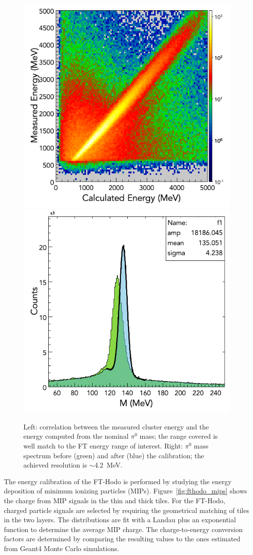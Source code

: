\begin{figure}
\includegraphics[height=0.48\columnwidth]{fig/ftcal_pi0linearity.png}
\includegraphics[height=0.48\columnwidth]{fig/ftcal_pi0resolution.png}
\caption{Left: correlation between the measured cluster energy and the energy computed from the nominal $\pi^0$
  mass; the range covered is well match to the FT energy range of interest. Right: $\pi^0$ mass spectrum before
  (green) and after (blue) the calibration; the achieved resolution is $\sim$4.2~MeV.}
\label{fig:ftcal_pi0res}
\end{figure}

The energy calibration of the FT-Hodo is performed by studying the energy deposition of minimum ionizing particles
(MIPs). Figure~\ref{fig:fthodo_mips} shows the charge from MIP signals in the thin and thick tiles. For the FT-Hodo,
charged particle signals are selected by requiring the geometrical matching of tiles in the two layers. The
distributions are fit with a Landau plus an exponential function to determine the average MIP charge. The
charge-to-energy conversion factors are determined by comparing the resulting values to the ones estimated from
Geant4 Monte Carlo simulations.

